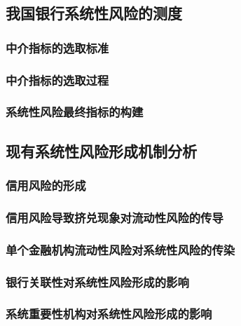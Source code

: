 \newpage
\subsection{我国银行系统性风险的测度}

\subsubsection{中介指标的选取标准}

\subsubsection{中介指标的选取过程}

\subsubsection{系统性风险最终指标的构建}

\newpage
\subsection{现有系统性风险形成机制分析}

\subsubsection{信用风险的形成}

\subsubsection{信用风险导致挤兑现象对流动性风险的传导}

\subsubsection{单个金融机构流动性风险对系统性风险的传染}

\subsubsection{银行关联性对系统性风险形成的影响}


\subsubsection{系统重要性机构对系统性风险形成的影响}

